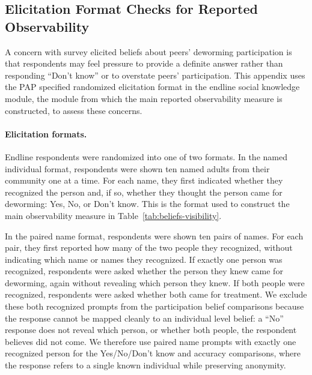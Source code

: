 \documentclass[ECM\space ReStud.tex]{subfiles}
\begin{document}
\clearpage


\subsection{Elicitation Format Checks for Reported Observability}
\label{app:demand_checks}

A concern with survey elicited beliefs about peers' deworming participation is that respondents may feel pressure to provide a definite answer rather than responding ``Don't know'' or to overstate peers' participation. This appendix uses the PAP specified randomized elicitation format in the endline social knowledge module, the module from which the main reported observability measure is constructed, to assess these concerns.

\paragraph{Elicitation formats.}
Endline respondents were randomized into one of two formats. In the named individual format, respondents were shown ten named adults from their community one at a time. For each name, they first indicated whether they recognized the person and, if so, whether they thought the person came for deworming: Yes, No, or Don't know. This is the format used to construct the main observability measure in Table~\ref{tab:beliefs-visibility}.

In the paired name format, respondents were shown ten pairs of names. For each pair, they first reported how many of the two people they recognized, without indicating which name or names they recognized. If exactly one person was recognized, respondents were asked whether the person they knew came for deworming, again without revealing which person they knew. If both people were recognized, respondents were asked whether both came for treatment. We exclude these both recognized prompts from the participation belief comparisons because the response cannot be mapped cleanly to an individual level belief: a ``No'' response does not reveal which person, or whether both people, the respondent believes did not come. We therefore use paired name prompts with exactly one recognized person for the Yes/No/Don't know and accuracy comparisons, where the response refers to a single known individual while preserving anonymity.
\end{document}

